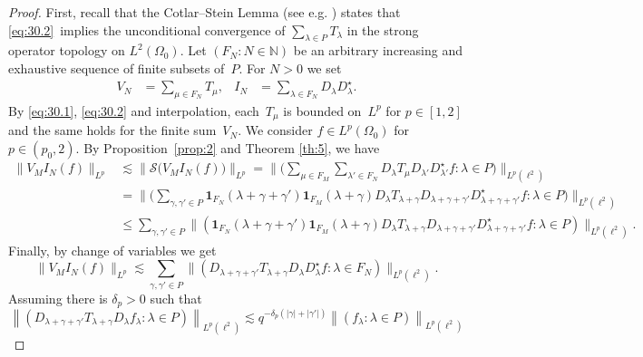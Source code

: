 \documentclass[a4paper]{amsart}
\newcommand{\norm}[1]{{\left\lVert #1 \right\rVert}}
\newcommand{\abs}[1]{{\lvert {#1} \rvert}}
\newcommand{\ind}[1]{{\mathbf{1}_{{#1}}}}
\newcommand{\seq}[2]{\left({#1}: {#2}\right)}
\newcommand{\NN}{\mathbb{N}}
\newcommand{\calS}{\mathcal{S}}
\theoremstyle{plain}
\theoremstyle{definition}
\theoremstyle{remark}
\numberwithin{equation}{section}
\theoremstyle{plain}
\begin{document}
\begin{proof}
First, recall that the Cotlar--Stein Lemma (see e.g. \cite{steinone})
states that \eqref{eq:30.2}~implies the unconditional convergence of
$\sum_{\lambda \in P} T_\lambda$ in the strong operator topology on
$L^2(\Omega_0)$.  Let $\seq{F_N}{N \in \NN}$ be an arbitrary
increasing and exhaustive sequence of finite subsets of~$P$. For $N >
0$ we set
\begin{align*}
  V_N &= \sum_{\mu \in F_N} T_\mu, &
  I_N &= \sum_{\lambda \in F_N} D_\lambda D_\lambda^\star.
\end{align*}
By \eqref{eq:30.1}, \eqref{eq:30.2} and interpolation, each~$T_\mu$
is bounded on~$L^p$ for $p\in [1,2]$ and the same holds for the
finite sum~$V_N$.  We consider $f \in L^p(\Omega_0)$ for $p \in
(p_0, 2)$. By Proposition~\ref{prop:2} and Theorem \ref{th:5}, we
have
\begin{align*}
  \big\lVert V_M I_N (f) \big\rVert_{L^p} 
  & \lesssim 
  \big\lVert 
  \calS \big(V_M I_N(f) \big) 
  \big\rVert_{L^p}
  =\Big\lVert\Big(
  \sum_{\mu \in F_M} 
  \sum_{\lambda' \in F_N}
  D_\lambda T_\mu D_{\lambda'} D_{\lambda'}^\star f : \lambda \in P \Big)
  \Big\rVert_{L^p(\ell^2)}\\
  &
	=\Big\lVert \Big(
  \sum_{\gamma, \gamma' \in P}
  \ind{F_N}(\lambda + \gamma + \gamma')
  \ind{F_M}(\lambda + \gamma)
  D_\lambda T_{\lambda+\gamma} D_{\lambda+\gamma+\gamma'} 
  D_{\lambda+\gamma+\gamma'}^\star f
  : \lambda \in P \Big)
  \Big\rVert_{L^p(\ell^2)}\\
  &
  \leq
  \sum_{\gamma, \gamma' \in P}
  \big\lVert \seq{
  \ind{F_N}(\lambda+\gamma+\gamma') 
  \ind{F_M}(\lambda+\gamma)
  D_\lambda T_{\lambda+\gamma} D_{\lambda+\gamma+\gamma'} 
  D_{\lambda+\gamma+\gamma'}^\star f}{\lambda \in P}
  \big\rVert_{L^p(\ell^2)}.
\end{align*}
Finally, by change of variables we get
\begin{equation*}
  \big\lVert
  V_M I_N(f) 
  \big\rVert_{L^p} 
  \lesssim
  \sum_{\gamma,\gamma' \in P}
  \big\lVert 
  \seq{
    D_{\lambda+\gamma+\gamma'} T_{\lambda+\gamma} D_\lambda D_\lambda^\star f}
  {\lambda \in F_N}
  \big\rVert_{L^p(\ell^2)}.
\end{equation*}
Assuming there is $\delta_p > 0$ such that
\begin{equation}
  \label{eq:20}
  \norm{\seq{D_{\lambda+\gamma+\gamma'} 
  T_{\lambda+\gamma} D_\lambda f_\lambda}{\lambda \in P}}_{L^p(\ell^2)}
  \lesssim q^{-\delta_p (\abs{\gamma} + \abs{\gamma'})} 
  \norm{\seq{f_\lambda}{\lambda \in P}}_{L^p(\ell^2)}

\end{equation}
\end{proof}
\end{document}
